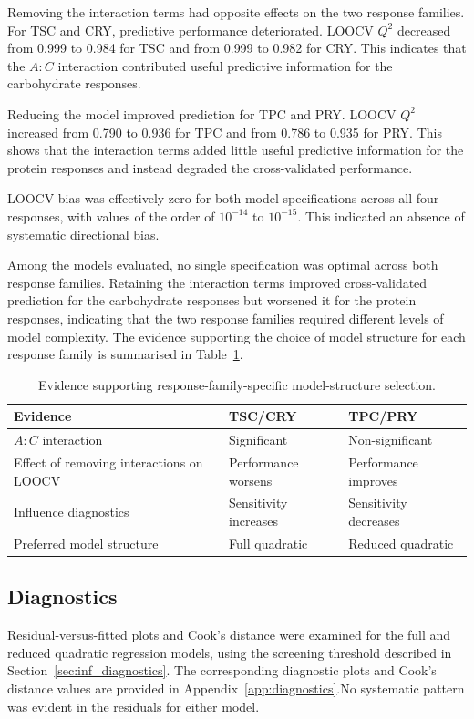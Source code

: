 \documentclass[MScDSA]{uccthesis}
\begin{document}
Removing the interaction terms had opposite effects on the two response families. For TSC and CRY, predictive performance deteriorated. LOOCV $Q^2$ decreased from 0.999 to 0.984 for TSC and from 0.999 to 0.982 for CRY. This indicates that the $A:C$ interaction contributed useful predictive information for the carbohydrate responses.

Reducing the model improved prediction for TPC and PRY. LOOCV $Q^2$ increased from 0.790 to 0.936 for TPC and from 0.786 to 0.935 for PRY. This shows that the interaction terms added little useful predictive information for the protein responses and instead degraded the cross-validated performance.

LOOCV bias was effectively zero for both model specifications across all four responses, with values of the order of $10^{-14}$ to $10^{-15}$. This indicated an absence of systematic directional bias.

Among the models evaluated, no single specification was optimal across both response families. Retaining the interaction terms improved cross-validated prediction for the carbohydrate responses but worsened it for the protein responses, indicating that the two response families required different levels of model complexity.
The evidence supporting the choice of model structure for each response family is summarised in Table~\ref{tab:model_structure_choice}.

\begin{table}[H]
\centering
\caption{Evidence supporting response-family-specific model-structure selection.}
\label{tab:model_structure_choice}
\begin{tabular}{lll}
\toprule
\textbf{Evidence} & \textbf{TSC/CRY} & \textbf{TPC/PRY} \\
\midrule
$A:C$ interaction & Significant & Non-significant \\
Effect of removing interactions on LOOCV & Performance worsens & Performance improves \\
Influence diagnostics & Sensitivity increases & Sensitivity decreases\\
Preferred model structure & Full quadratic & Reduced quadratic \\
\bottomrule
\end{tabular}
\end{table}

\subsection{Diagnostics}
\label{sec:diagnostics}
Residual-versus-fitted plots and Cook's distance were examined for the full and reduced quadratic regression models, using the screening threshold described in Section~\ref{sec:inf_diagnostics}. The corresponding diagnostic plots and Cook's distance values are provided in Appendix~\ref{app:diagnostics}.No systematic pattern was evident in the residuals for either model. 
\end{document}
